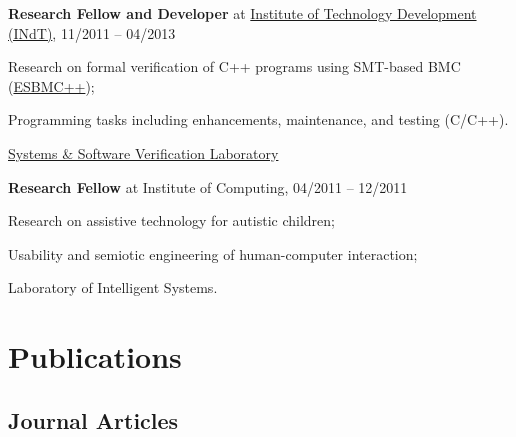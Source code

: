 \documentclass[letterpaper]{article}
\renewenvironment{itemize}{
  \begin{list}{}{
    \setlength{\leftmargin}{1.5em}
  }
}{
  \end{list}
}
\begin{document}
\begin{enumerate}
\begin{itemize}
      \end{itemize}
      \item{{\bf Research Fellow and Developer} at \href{http://www.indt.org.br}{Institute of Technology Development (INdT)}, 11/2011 -- 04/2013}
            \begin{itemize}
        \item{\textendash} {Research on formal verification of C++ programs using SMT-based BMC (\href{http://www.esbmc/}{ESBMC++});}
        \item{\textendash} {Programming tasks including enhancements, maintenance, and testing (C/C++).}
        \item{\textendash} \href{https://ssvlab.github.io}{Systems \& Software Verification Laboratory}
      \end{itemize}
      \item{{\bf Research Fellow} at Institute of Computing, 04/2011 -- 12/2011}
            \begin{itemize}
        \item{\textendash} {Research on assistive technology for autistic children;}
        \item{\textendash} {Usability and semiotic engineering of human-computer interaction;}
        \item{\textendash} {Laboratory of Intelligent Systems.}
      \end{itemize}
    \end{enumerate}
    
\section*{Publications}

\subsection*{Journal Articles}
\end{document}
